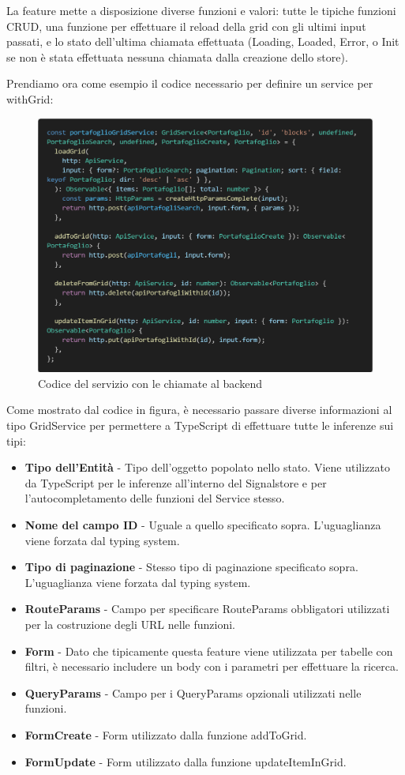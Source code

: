 La feature mette a disposizione diverse funzioni e valori: tutte le tipiche funzioni CRUD, una funzione per effettuare il reload della grid con gli ultimi input passati,
e lo stato dell'ultima chiamata effettuata (Loading, Loaded, Error, o Init se non \`e stata effettuata nessuna chiamata dalla creazione dello store).

Prendiamo ora come esempio il codice necessario per definire un service per withGrid:
\begin{figure}[H]
  \centering
  \includegraphics[width=12cm]{images/code-service.png}
  \caption{Codice del servizio con le chiamate al backend}
\end{figure}
Come mostrato dal codice in figura, \`e necessario passare diverse informazioni al tipo GridService per permettere a TypeScript di effettuare tutte le inferenze sui tipi:
\begin{itemize}
  \item \textbf{Tipo dell'Entit\`a} - Tipo dell'oggetto popolato nello stato. Viene utilizzato da TypeScript per le inferenze all'interno del Signalstore e
    per l'autocompletamento delle funzioni del Service stesso.
  \item \textbf{Nome del campo ID} - Uguale a quello specificato sopra. L'uguaglianza viene forzata dal typing system.
  \item \textbf{Tipo di paginazione} - Stesso tipo di paginazione specificato sopra. L'uguaglianza viene forzata dal typing system.
  \item \textbf{RouteParams} - Campo per specificare RouteParams obbligatori utilizzati per la costruzione degli URL nelle funzioni.
  \item \textbf{Form} - Dato che tipicamente questa feature viene utilizzata per tabelle con filtri, \`e necessario includere un body con i parametri per effettuare la ricerca.
  \item \textbf{QueryParams} - Campo per i QueryParams opzionali utilizzati nelle funzioni.
  \item \textbf{FormCreate} - Form utilizzato dalla funzione addToGrid.
  \item \textbf{FormUpdate} - Form utilizzato dalla funzione updateItemInGrid.
\end{itemize}
